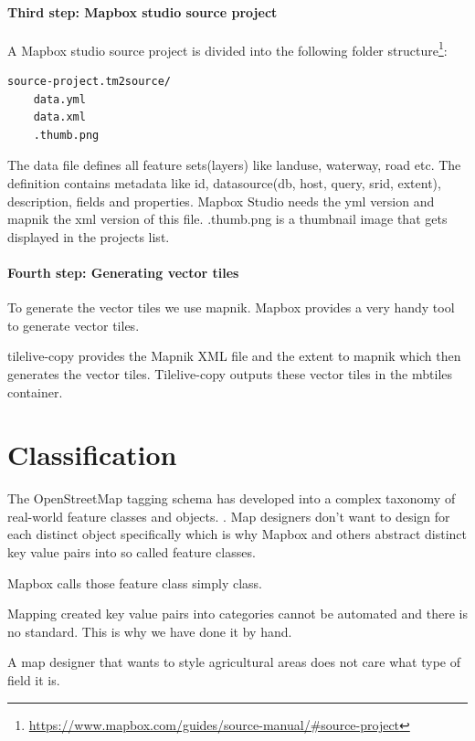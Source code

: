 \paragraph{Third step: Mapbox studio source project}

A Mapbox studio source project is divided into the following folder
structure\footnote{\url{https://www.mapbox.com/guides/source-manual/\#source-project}}:

\begin{verbatim}
source-project.tm2source/
    data.yml
    data.xml
    .thumb.png
\end{verbatim}

The data file defines all feature sets(layers) like landuse, waterway,
road etc. The definition contains metadata like id, datasource(db, host,
query, srid, extent), description, fields and properties. Mapbox Studio
needs the yml version and mapnik the xml version of this file.
.thumb.png is a thumbnail image that gets displayed in the projects
list.

\paragraph{Fourth step: Generating vector tiles}

To generate the vector tiles we use mapnik. Mapbox provides a very handy
tool to generate vector tiles.

tilelive-copy provides the Mapnik XML file and the extent to mapnik
which then generates the vector tiles. Tilelive-copy outputs these
vector tiles in the mbtiles container.
\newpage


\section{Classification}
\label{classification}

The OpenStreetMap tagging schema has developed into a complex taxonomy of real-world feature classes and objects. \cite[p. 15]{haklay2008openstreetmap}. Map designers don't want to design
for each distinct object specifically which is why Mapbox and others abstract distinct key value pairs into so called feature classes.

Mapbox calls those feature class simply class.

Mapping created key value pairs into categories cannot be automated
and there is no standard. This is why we have done it by hand.

A map designer that wants to style agricultural areas does not care
what type of field it is.


